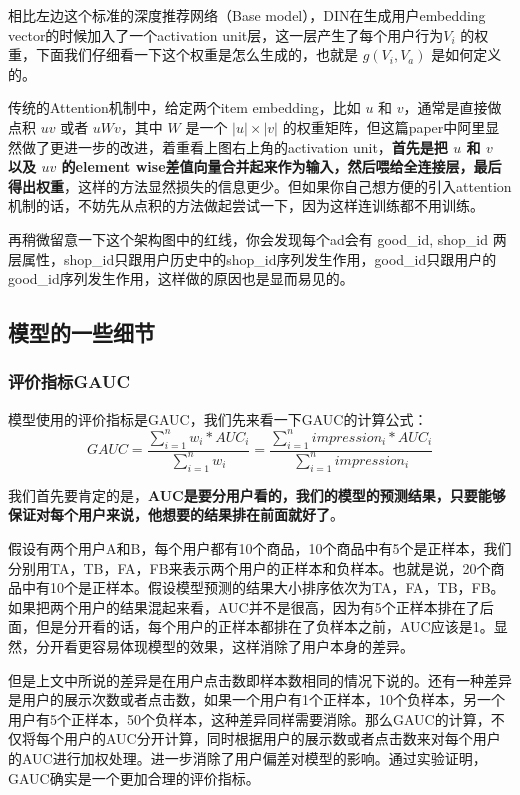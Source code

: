 \documentclass[12pt]{article}
\begin{document}
相比左边这个标准的深度推荐网络（Base model），DIN在生成用户embedding vector的时候加入了一个activation unit层，这一层产生了每个用户行为$V_i$ 的权重，下面我们仔细看一下这个权重是怎么生成的，也就是 $g(V_i, V_a)$ 是如何定义的。

传统的Attention机制中，给定两个item embedding，比如 $u$ 和 $v$，通常是直接做点积 $uv$ 或者 $uWv$，其中 $W$ 是一个 $|u|\times |v|$ 的权重矩阵，但这篇paper中阿里显然做了更进一步的改进，着重看上图右上角的activation unit，\textbf{首先是把 $u$ 和 $v$ 以及 $u v$ 的element wise差值向量合并起来作为输入，然后喂给全连接层，最后得出权重}，这样的方法显然损失的信息更少。但如果你自己想方便的引入attention机制的话，不妨先从点积的方法做起尝试一下，因为这样连训练都不用训练。

再稍微留意一下这个架构图中的红线，你会发现每个ad会有 good\_id, shop\_id 两层属性，shop\_id只跟用户历史中的shop\_id序列发生作用，good\_id只跟用户的good\_id序列发生作用，这样做的原因也是显而易见的。

\subsection{模型的一些细节}
\subsubsection{评价指标GAUC}
模型使用的评价指标是GAUC，我们先来看一下GAUC的计算公式：
$$
GAUC = \frac{\sum_{i=1}^nw_i*AUC_i}{\sum_{i=1}^nw_i} = \frac{\sum_{i=1}^n impression_i * AUC_i}{\sum_{i=1}^nimpression_i}
$$

我们首先要肯定的是，\textbf{AUC是要分用户看的，我们的模型的预测结果，只要能够保证对每个用户来说，他想要的结果排在前面就好了}。

假设有两个用户A和B，每个用户都有10个商品，10个商品中有5个是正样本，我们分别用TA，TB，FA，FB来表示两个用户的正样本和负样本。也就是说，20个商品中有10个是正样本。假设模型预测的结果大小排序依次为TA，FA，TB，FB。如果把两个用户的结果混起来看，AUC并不是很高，因为有5个正样本排在了后面，但是分开看的话，每个用户的正样本都排在了负样本之前，AUC应该是1。显然，分开看更容易体现模型的效果，这样消除了用户本身的差异。

但是上文中所说的差异是在用户点击数即样本数相同的情况下说的。还有一种差异是用户的展示次数或者点击数，如果一个用户有1个正样本，10个负样本，另一个用户有5个正样本，50个负样本，这种差异同样需要消除。那么GAUC的计算，不仅将每个用户的AUC分开计算，同时根据用户的展示数或者点击数来对每个用户的AUC进行加权处理。进一步消除了用户偏差对模型的影响。通过实验证明，GAUC确实是一个更加合理的评价指标。
\end{document}
